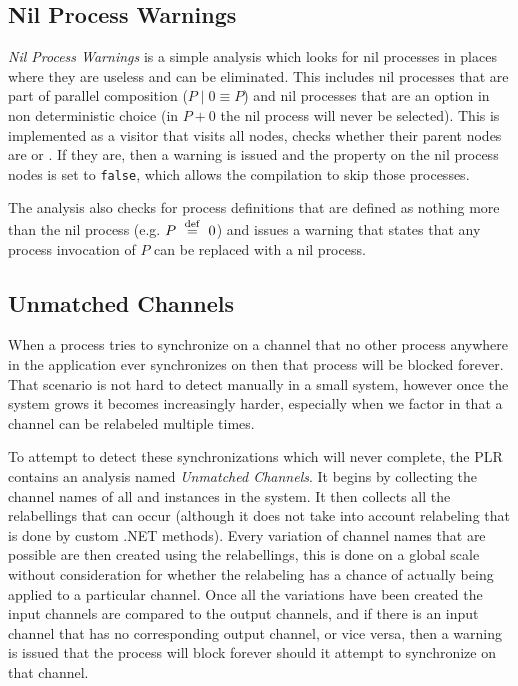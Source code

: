 \subsection{Nil Process Warnings}

	\textit{Nil Process Warnings} is a simple analysis which looks for nil 
	processes in places where they are useless and can be eliminated. This 
	includes nil processes that are part of parallel composition ($P \mid 0 
	\equiv P$) and nil processes that are an option in non deterministic choice 
	(in $P+0$ the nil process will never be selected). This is implemented as a 
	visitor that visits all  nodes, checks whether their 
	parent nodes are  or 
	. If they are, then a warning is issued and 
	the property  on the nil process nodes is set to 
	\texttt{false}, which allows the compilation to skip those processes.
	
	The analysis also checks for process definitions that are defined as nothing 
	more than the nil process (e.g. $P \ \stackrel{\mathrm{def}}{=}\  0$) and issues a warning that 
	states that any process invocation of $P$ can be replaced with a nil process.

\subsection{Unmatched Channels}

	When a process tries to synchronize on a channel that no other process 
	anywhere in the application ever synchronizes on then that process will be 
	blocked forever. That scenario is not hard to detect manually in a small 
	system, however once the system grows it becomes increasingly harder, 
	especially when we factor in that a channel can be relabeled multiple 
	times. 
	
	To attempt to detect these synchronizations which will never complete, the 
	PLR contains an analysis named \textit{Unmatched Channels}. It begins by
	collecting the channel names of all  and 
	instances in the system. It then collects all the relabellings that can occur
	(although it does not take into account relabeling that is done by custom
	.NET methods). Every variation of channel names that are possible are then
	created using the relabellings, this is done on a global scale without 
	consideration for whether the relabeling has a chance of actually being
	applied to a particular channel. Once all the variations have been created
	the input channels are compared to the output channels, and if there is
	an input channel that has no corresponding output channel, or vice versa,
	then a warning is issued that the process will block forever should it 
	attempt to synchronize on that channel. 
	

